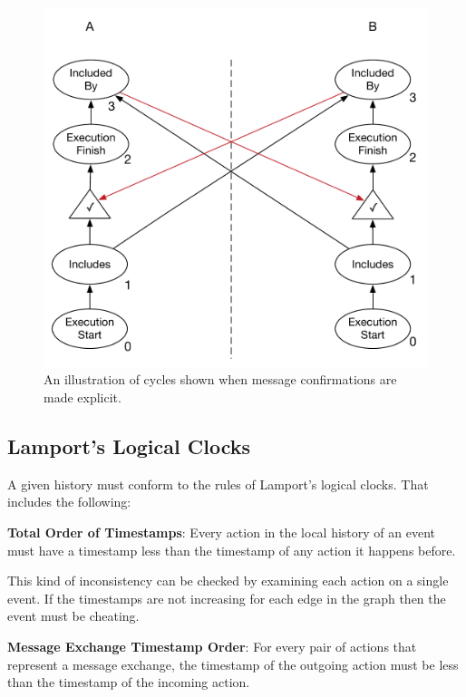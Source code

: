 	\begin{figure}[H]
		\centering
		\includegraphics[height=0.3\textheight]{6validation/images/total-order-of-counterpart-timestamps-cycle-confirmation.pdf}
		\caption{An illustration of cycles shown when message confirmations are made explicit.}
		\label{fig:validation:explicit-message-confirmations}
	\end{figure}
	
	\subsection{Lamport's Logical Clocks}
	A given history must conform to the rules of Lamport's logical clocks. That includes the following:
	
	\begin{ruledef}
		\textbf{Total Order of Timestamps}: Every action in the local history of an event must have a timestamp less than the timestamp of any action it happens before.
		\label{rule:total-order-timestamps}
	\end{ruledef}
	
	\noindent This kind of inconsistency can be checked by examining each action on a single event. If the timestamps are not increasing for each edge in the graph then the event must be cheating.
	
	\begin{ruledef}
		\textbf{Message Exchange Timestamp Order}: For every pair of actions that represent a message exchange, the timestamp of the outgoing action must be less than the timestamp of the incoming action.
		\label{rule:message-exchange-timestamp-order}
	\end{ruledef}
	
